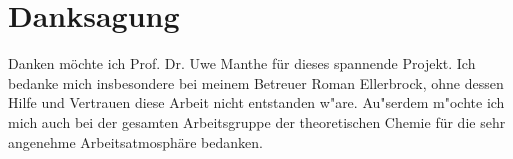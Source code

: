 \chapter{Danksagung}
Danken m\"ochte ich Prof. Dr. Uwe Manthe f\"ur dieses spannende Projekt.
Ich bedanke mich insbesondere bei meinem Betreuer Roman Ellerbrock, ohne dessen Hilfe und Vertrauen 
diese Arbeit nicht entstanden w"are. 
Au"serdem m"ochte ich mich auch bei der gesamten Arbeitsgruppe der theoretischen Chemie f\"ur die sehr angenehme Arbeitsatmosph\"are bedanken.
